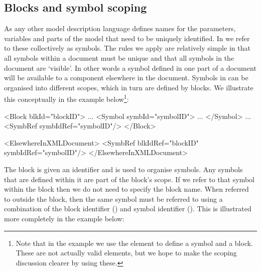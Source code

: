 \subsection{Blocks and symbol scoping}
\label{sec:blocks}
\label{sec:scoping-rules}

As any other model description language \pharmml defines names for the
parameters, variables and parts of the model that need to be uniquely
identified. In \pharmml we refer to these collectively as symbols. The
rules we apply are relatively simple in that all symbols within a
\pharmml document must be unique and that all symbols in the document are
`visible'. In other words a symbol defined in one part of a document
will be available to a component elsewhere in the document. Symbols in
\pharmml can be organised into different scopes, which in turn are
defined by blocks. We illustrate this conceptually in the example
below\footnote{Note that in the example we use the element
   to define a symbol and  a block. These
  are not actually valid \pharmml elements, but we hope to make the
  scoping discussion clearer by using these.}:
%
\begin{xmlcode}
<Block blkId="blockID">
	...
	<Symbol symbId="symbolID">
		...
	</Symbol>
	...
        <SymbRef symbIdRef="symbolID"/>
</Block>

<ElsewhereInXMLDocument>
	<SymbRef blkIdRef="blockID" symbIdRef="symbolID"/>
</ElsewhereInXMLDocument>
\end{xmlcode}
%
The block is given an identifier and is used to organise symbols. Any
symbols that are defined within it are part of the block's scope. If
we refer to that symbol within the block then we do not need to specify the
block name. When referred to outside the block, then the same symbol
must be referred to using a combination of the block identifier
() and symbol identifier (). This is illustrated
more completely in the example below:
